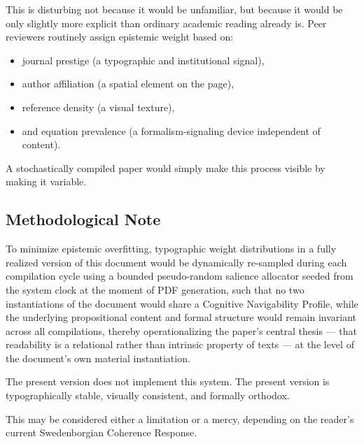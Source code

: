 \documentclass[12pt, a4paper]{article}
\begin{document}
This is disturbing not because it would be unfamiliar, but because it would be only slightly more explicit than ordinary academic reading already is. Peer reviewers routinely assign epistemic weight based on:

\begin{itemize}
  \item journal prestige (a typographic and institutional signal),
  \item author affiliation (a spatial element on the page),
  \item reference density (a visual texture),
  \item and equation prevalence (a formalism-signaling device independent of content).
\end{itemize}

A stochastically compiled paper would simply make this process visible by making it variable.

\subsection{Methodological Note}

To minimize epistemic overfitting, typographic weight distributions in a fully realized version of this document would be dynamically re-sampled during each compilation cycle using a bounded pseudo-random salience allocator seeded from the system clock at the moment of PDF generation, such that no two instantiations of the document would share a Cognitive Navigability Profile, while the underlying propositional content and formal structure would remain invariant across all compilations, thereby operationalizing the paper's central thesis --- that readability is a relational rather than intrinsic property of texts --- at the level of the document's own material instantiation.

The present version does not implement this system. The present version is typographically stable, visually consistent, and formally orthodox.

This may be considered either a limitation or a mercy, depending on the reader's current Swedenborgian Coherence Response.
\end{document}
